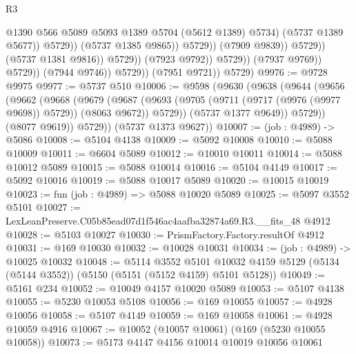 \begin{lexlean}{R3}
\begin{coremodule}
                                                    @1390
                                                    @566
                                                    @5089
                                                    @5093
                                                    @1389
                                                    @5704
                                                    (@5612 @1389)
                                                    @5734)
                                                  (@5737 @1389 @5677))
                                                @5729))
                                            (@5737 @1385 @9865))
                                          @5729))
                                      (@7909 @9839))
                                    @5729))
                                (@5737 @1381 @9816))
                              @5729))
                          (@7923 @9792))
                        @5729))
                    (@7937 @9769))
                  @5729))
              (@7944 @9746))
            @5729))
        (@7951 @9721))
      @5729)
@9976 := @9728 @9975
@9977 := @5737 @510
@10006 := @9598
    (@9630
      (@9638
        (@9644
          (@9656
            (@9662
              (@9668
                (@9679
                  (@9687
                    (@9693 (@9705 (@9711 (@9717 (@9976 (@9977 @9698)) @5729)) (@8063 @9672)) @5729))
                  (@5737 @1377 @9649))
                @5729))
            (@8077 @9619))
          @5729))
      (@5737 @1373 @9627))
@10007 := (job : @4989) -> @5086
@10008 := @5104 @4138
@10009 := @5092 @10008
@10010 := @5088 @10009
@10011 := @6604 @5089
@10012 := @10010 @10011
@10014 := @5088 @10012 @5089
@10015 := @5088 @10014
@10016 := @5104 @4149
@10017 := @5092 @10016
@10019 := @5088 @10017 @5089
@10020 := @10015 @10019
@10023 := fun (job : @4989) => @5088 @10020 @5089
@10025 := @5097 @3552 @5101
@10027 := LexLeanPreserve.C05b85ead07d1f546ac4aafba32874a69.R3.__fits_48 @4912
@10028 := @5103 @10027
@10030 := PrismFactory.Factory.resultOf @4912
@10031 := @169 @10030
@10032 := @10028 @10031
@10034 := (job : @4989) -> @10025 @10032
@10048 := @5114
    @3552
    @5101
    @10032
    @4159
    @5129
    (@5134 (@5144 @3552))
    (@5150 (@5151 (@5152 @4159) @5101 @5128))
@10049 := @5161 @234
@10052 := @10049 @4157 @10020 @5089
@10053 := @5107 @4138
@10055 := @5230 @10053 @5108
@10056 := @169 @10055
@10057 := @4928 @10056
@10058 := @5107 @4149
@10059 := @169 @10058
@10061 := @4928 @10059 @4916
@10067 := @10052 (@10057 @10061) (@169 (@5230 @10055 @10058))
@10073 := @5173 @4147 @4156 @10014 @10019 @10056 @10061

\end{coremodule}
\end{lexlean}
